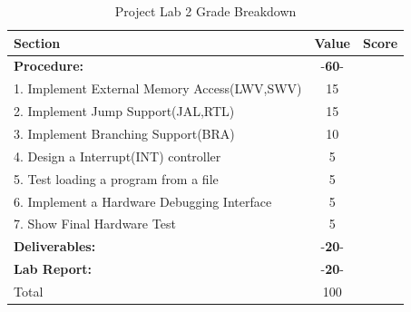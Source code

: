 \documentclass{article}
\begin{document}
\begin{table}[!htb]
  \begin{center}
    \begin{tabular}[width=0.9\textwidth]{|l|c|l|}
       \hline
       Section & Value & Score\\
       \hline 
       \multicolumn{1}{|l}{\textbf{Procedure:}}  & -\textbf{60}- &\\
       \hline
       1. Implement External Memory Access(LWV,SWV) & 15 &\\
       \hline
       2. Implement Jump Support(JAL,RTL) & 15 &\\
       \hline
       3. Implement Branching Support(BRA) & 10 &\\
       \hline
       4. Design a Interrupt(INT) controller & 5 &\\
       \hline
       5. Test loading a program from a file & 5 &\\
       \hline
       6. Implement a Hardware Debugging Interface & 5 &\\
       \hline
       7. Show Final Hardware Test & 5 &\\
       \hline
       \multicolumn{1}{|l}{\textbf{Deliverables:}}  & -\textbf{20}- &\\
       \hline
       \multicolumn{1}{|l}{\textbf{Lab Report:}}  & -\textbf{20}- &\\
       \hline
       \hline
       \multicolumn{1}{|l}{Total} & \multicolumn{1}{c|}{100} &\\
       \hline
    \end{tabular}
  \end{center}
  \caption{Project Lab 2 Grade Breakdown}
\end{table}
\end{document}
